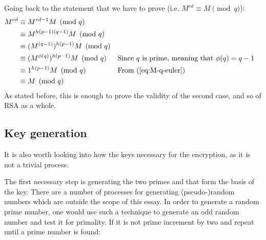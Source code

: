 \documentclass[12pt, titlepage]{article}
\begin{document}
        Going back to the statement that we have to prove (i.e. $M^{ed} \equiv M \pmod{q}$):
        \begin{align*}
            M^{ed} &\equiv M^{ed - 1} M \pmod{q} \\
                   &\equiv M^{h(p-1)(q-1)} M \pmod{q} \\
                   &\equiv (M^{(q-1)})^{h(p-1)} M \pmod{q} \\
                   &\equiv (M^{\phi(q)})^{h(p-1)} M \pmod{q} &&\text{Since $q$ is prime,
                   meaning that $\phi(q) = q-1$} \\
                   &\equiv 1^{h(p-1)} M \pmod{q} &&\text{From (\ref{eq:M-q-euler})}\\
                   &\equiv M \pmod{q}
        \end{align*}
        As stated before, this is enough to prove the validity of the second case, and so of
        RSA as a whole.
    
    \subsection{Key generation}
    It is also worth looking into how the keys necessary for the encryption, as it is not a
    trivial process.

    The first necessary step is generating the two primes  and  that form
    the basis of the key. There are a number of processes for generating (pseudo-)random
    numbers which are outside the scope of this essay. In order to generate a random prime
    number, one would use such a technique to generate an odd random number and test it for
    primality.  If it is not prime increment by two and repeat until a prime number is
    found:
    
    \begin{figure}[H]
    \end{figure}
\end{document}
